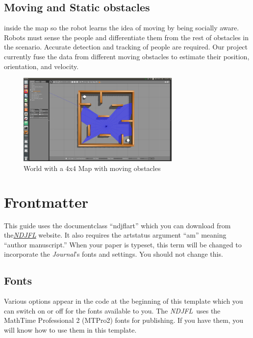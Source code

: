 \documentclass{ndjflart}
\theoremstyle{definition}
\theoremstyle{remark}
\newcommand{\NDJFL}{\emph{NDJFL}}
\newcommand{\Jo}{\emph{Journal}}
\begin{document}
\subsection{Moving and Static obstacles}\label{fonts} inside the map so the robot learns the idea of
moving by being socially aware. Robots must sense the people and differentiate them from the rest of  obstacles in the scenario. Accurate detection and tracking of people are required. Our project currently fuse the data from different moving obstacles to estimate their position, orientation, and velocity.


\begin{figure}
\begin{center}
\vspace{0.5em}
    \includegraphics[width=8cm]{images/worldimg}
    \vspace{-.5em}
\caption{World with a 4x4 Map with moving obstacles}
\label{fig:framework}
    \end{center}
\end{figure}


\section{Frontmatter}\label{front}
This guide uses the documentclass ``ndjflart'' which you can download
from the\linebreak \href{http://ndjfl.nd.edu}{\NDJFL} website.  It
also requires the artstatus argument ``am'' meaning ``author
manuscript.''  When your paper is typeset, this term will be changed
to incorporate the \Jo's fonts and settings.  You should not change
this.


\subsection{Fonts}\label{fonts} 
Various options appear in the code at the beginning of this template
which you can switch on or off for the fonts available to you.  The
\NDJFL\ uses the MathTime{\tiny\texttrademark} Professional 2
(MTPro2)%
%
%
fonts for publishing.  If you have them, you will know how to use them
in this template.
\end{document}
